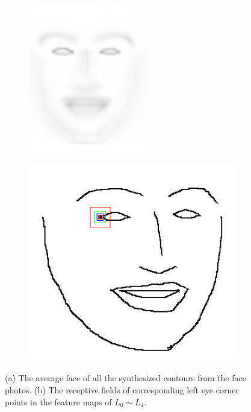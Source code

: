 \documentclass{article}
\begin{document}
\begin{figure}
\centering
\begin{subfigure}[b]{0.2\textwidth}	
	\centering
	\includegraphics[width=0.13\textheight]{average_face.png}
	\caption{ }
	\label{fig:average_face}
\end{subfigure}	
 \hfill
\begin{subfigure}[b]{0.2\textwidth}
	\centering
	\includegraphics[width=0.15\textheight]{receptive_field.png}
	\caption{ }
	\label{fig:receptive}
	\end{subfigure}	

\caption{(a) The average face of all the synthesized contours from the face photos. (b) The receptive fields of corresponding left eye corner points in the feature maps of $L_0\sim L_4$.}
\end{figure}

 

\end{document}
